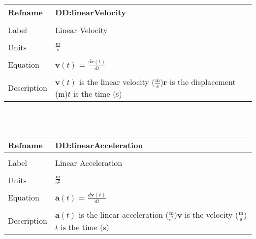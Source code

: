 \documentclass[12pt]{article}
\begin{document}
~\newline
\noindent \begin{minipage}{\textwidth}
\begin{tabular}{p{} p{}}
\toprule \textbf{Refname} & \textbf{DD:linearVelocity}
\label{DD:linearVelocity}
\\ \midrule \\
Label & Linear Velocity
\\ \midrule \\
Units & $\frac{\text{m}}{\text{s}}$
\\ \midrule \\
Equation & $\mathbf{v}(t)$ = $\frac{d \mathbf{r}\left(t\right)}{d t}$
\\ \midrule \\
Description & $\mathbf{v}(t)$ is the linear velocity ($\frac{\text{m}}{\text{s}}$)\newline$\mathbf{r}$ is the displacement (m)\newline$t$ is the time (s)
\\ \bottomrule \end{tabular}
\end{minipage}\\
~\newline
\noindent \begin{minipage}{\textwidth}
\begin{tabular}{p{} p{}}
\toprule \textbf{Refname} & \textbf{DD:linearAcceleration}
\label{DD:linearAcceleration}
\\ \midrule \\
Label & Linear Acceleration
\\ \midrule \\
Units & $\frac{\text{m}}{\text{s}^{2}}$
\\ \midrule \\
Equation & $\mathbf{a}(t)$ = $\frac{d \mathbf{v}\left(t\right)}{d t}$
\\ \midrule \\
Description & $\mathbf{a}(t)$ is the linear acceleration ($\frac{\text{m}}{\text{s}^{2}}$)\newline$\mathbf{v}$ is the velocity ($\frac{\text{m}}{\text{s}}$)\newline$t$ is the time (s)
\\ \bottomrule \end{tabular}
\end{minipage}\\
~\newline
\end{document}
